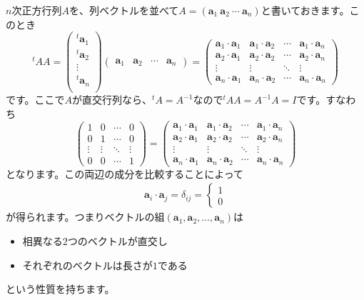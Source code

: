 $n$次正方行列$A$を、列ベクトルを並べて$A = (\bm{a}_1 \ \bm{a}_2 \ \cdots \ \bm{a}_n)$と書いておきます。このとき
\[
{}^t\!A A = 
\begin{pmatrix}
{}^t \bm{a}_1 \\
{}^t \bm{a}_2 \\
\vdots \\
{}^t \bm{a}_n \\
\end{pmatrix}
\begin{pmatrix}
\bm{a}_1 &
\bm{a}_2 &
\cdots &
\bm{a}_n
\end{pmatrix}
= 
\begin{pmatrix}
\bm{a}_1 \cdot \bm{a}_1 & \bm{a}_1 \cdot \bm{a}_2 & \cdots & \bm{a}_1 \cdot \bm{a}_n \\
\bm{a}_2 \cdot \bm{a}_1 & \bm{a}_2 \cdot \bm{a}_2 & \cdots & \bm{a}_2 \cdot \bm{a}_n \\
\vdots & \vdots & \ddots & \vdots \\
\bm{a}_n \cdot \bm{a}_1 & \bm{a}_n \cdot \bm{a}_2 & \cdots & \bm{a}_n \cdot \bm{a}_n
\end{pmatrix}
\]
です。ここで$A$が直交行列なら、${}^t\!A = A^{-1}$なので${}^t\!A A = A^{-1} A = I$です。すなわち
\[
\begin{pmatrix}
1 & 0 & \cdots & 0 \\
0 & 1 & \cdots & 0 \\
\vdots & \vdots & \ddots & \vdots \\
0 & 0 & \cdots & 1
\end{pmatrix}
=
\begin{pmatrix}
\bm{a}_1 \cdot \bm{a}_1 & \bm{a}_1 \cdot \bm{a}_2 & \cdots & \bm{a}_1 \cdot \bm{a}_n \\
\bm{a}_2 \cdot \bm{a}_1 & \bm{a}_2 \cdot \bm{a}_2 & \cdots & \bm{a}_2 \cdot \bm{a}_n \\
\vdots & \vdots & \ddots & \vdots \\
\bm{a}_n \cdot \bm{a}_1 & \bm{a}_n \cdot \bm{a}_2 & \cdots & \bm{a}_n \cdot \bm{a}_n
\end{pmatrix}
\]
となります。この両辺の成分を比較することによって
\begin{align*}
\bm{a}_i \cdot \bm{a}_j =\delta_{ij} = 
\begin{cases}
1 \\
0
\end{cases}
\end{align*}
が得られます。つまりベクトルの組$(\bm{a}_1, \bm{a}_2, \ldots, \bm{a}_n)$は
\begin{itemize}
\item 相異なる$2$つのベクトルが直交し
\item それぞれのベクトルは長さが$1$である
\end{itemize}
という性質を持ちます。

